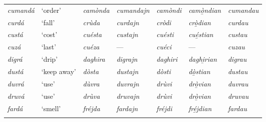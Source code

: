\begin{sidewaystable}
\begin{tabularx}{\textwidth}{lllllll}
		\textit{cumandá} & ‘order’ & \textit{camònda} & \textit{cumandajn} & \textit{camòndi} & \textit{camò̱ndian} & \textit{cumandau}\\
		\textit{curdá} & ‘fall’ & \textit{crùda} & \textit{curdajn} & \textit{cròdi} & \textit{crò̱dian} & \textit{curdau}\\
		\textit{custá} & `cost' & \textit{cuésta} & \textit{custajn} & \textit{cuésti} & \textit{cué̱stian} & \textit{custau}\\
		\textit{cuzá} & ‘last’ & \textit{cuéza} & --- & \textit{cuéci} & --- & \textit{cuzau}\\
		\textit{digrá} & ‘drip’ & \textit{daghira} & \textit{digrajn} & \textit{daghiri} & \textit{daghi̱rian} & \textit{digrau}\\
		\textit{dustá} & `keep away' & \textit{dòsta} & \textit{dustajn} & \textit{dòsti} & \textit{dò̱stian} & \textit{dustau}\\
		\textit{duvrá} & ‘use’ & \textit{dùvra} & \textit{duvrajn} & \textit{drùvi} & \textit{drò̱vian} & \textit{duvrau}\\
		\textit{druvá} & `use' & \textit{drùva} & \textit{druvajn} & \textit{drùvi} & \textit{drò̱vian} & \textit{druvau}\\
		\textit{fardá} & `smell' & \textit{fréjda} & \textit{fardajn} & \textit{fréjdi} & \textit{fré̱jdian} & \textit{fardau}\\
		\lspbottomrule&
	\end{tabularx}
\end{sidewaystable}



